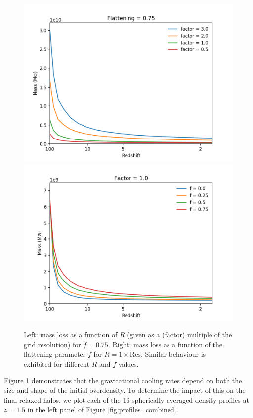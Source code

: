 \documentclass[a4paper,11pt]{article}
\begin{document}
\begin{figure}[!htb]
\centering
{}
  \includegraphics[trim={1cm 0 2cm 0.2cm},scale=0.55]{mass_loss_0_75.png}
\endminipage\hfill
{}%
  \includegraphics[trim={0.2cm 0 2cm 0.1cm},scale=0.55]{mass_loss_f_1.png}
\endminipage
\caption{Left: mass loss as a function of $R$ (given as a (factor) multiple of the grid resolution) for $f = 0.75$. Right: mass loss as a function of the flattening parameter $f$ for $R = 1 \times \mathrm{Res}$. Similar behaviour is exhibited for different $R$ and $f$ values.}\label{fig:mass_loss_flat_size}
\end{figure}

Figure \ref{fig:mass_loss_flat_size} demonstrates that the gravitational cooling rates depend on both the size and shape of the initial overdensity. To determine the impact of this on the final relaxed halos, we plot each of the 16 spherically-averaged density profiles at $z=1.5$ in the left panel of Figure \ref{fig:profiles_combined}. 
\end{document}
